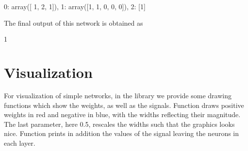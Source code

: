 \documentclass[letterpaper,10pt,english]{jupyterBook}
\begin{document}
\begin{sphinxVerbatim}[commandchars=\\\{\}]
\PYGZob{}0: array([ 1,  2, \PYGZhy{}1]), 1: array([1, 1, 0, 0, 0]), 2: [1]\PYGZcb{}
\end{sphinxVerbatim}

\sphinxAtStartPar
The final output of this network is obtained as

\begin{sphinxVerbatim}[commandchars=\\\{\}]
\PYG{p}{[}\PYG{p}{]}\PYG{p}{[}\PYG{p}{]}
\end{sphinxVerbatim}

\begin{sphinxVerbatim}[commandchars=\\\{\}]
1
\end{sphinxVerbatim}


\section{Visualization}
\label{\detokenize{docs/more_layers:visualization}}
\sphinxAtStartPar
For visualization of simple networks, in the  library we provide some drawing functions which show the weights, as well as the signals. Function  draws positive weights in red and negative in blue, with the widths reflecting their magnitude. The last parameter, here 0.5, rescales  the widths such that the graphics looks nice. Function   prints in addition the values of the signal leaving the neurons in each layer.

\begin{sphinxVerbatim}[commandchars=\\\{\}]
\end{sphinxVerbatim}

\noindent{}

\begin{sphinxVerbatim}[commandchars=\\\{\}]
\end{sphinxVerbatim}
\end{document}
